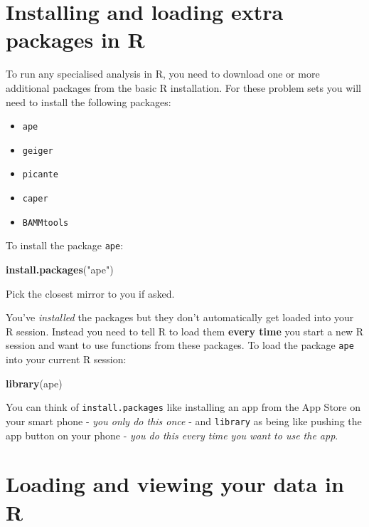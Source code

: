 \documentclass[]{book}
\newenvironment{Shaded}{\begin{snugshade}}{\end{snugshade}}
\newcommand{\KeywordTok}[1]{\textcolor[rgb]{0.13,0.29,0.53}{\textbf{{#1}}}}
\newcommand{\StringTok}[1]{\textcolor[rgb]{0.31,0.60,0.02}{{#1}}}
\newcommand{\NormalTok}[1]{{#1}}
\providecommand{\tightlist}{%
  \setlength{\itemsep}{0pt}\setlength{\parskip}{0pt}}
\theoremstyle{definition}
\theoremstyle{definition}
\theoremstyle{definition}
\theoremstyle{remark}
\begin{document}
\section{Installing and loading extra packages in
R}\label{installing-and-loading-extra-packages-in-r}

To run any specialised analysis in R, you need to download one or more
additional packages from the basic R installation. For these problem
sets you will need to install the following packages:

\begin{itemize}
\tightlist
\item
  \texttt{ape}
\item
  \texttt{geiger}
\item
  \texttt{picante}
\item
  \texttt{caper}
\item
  \texttt{BAMMtools}
\end{itemize}

To install the package \texttt{ape}:

\begin{Shaded}
\begin{Highlighting}[]
\KeywordTok{install.packages}\NormalTok{(}\StringTok{"ape"}\NormalTok{)}
\end{Highlighting}
\end{Shaded}

Pick the closest mirror to you if asked.

You've \emph{installed} the packages but they don't automatically get
loaded into your R session. Instead you need to tell R to load them
\textbf{every time} you start a new R session and want to use functions
from these packages. To load the package \texttt{ape} into your current
R session:

\begin{Shaded}
\begin{Highlighting}[]
\KeywordTok{library}\NormalTok{(ape)}
\end{Highlighting}
\end{Shaded}

You can think of \texttt{install.packages} like installing an app from
the App Store on your smart phone - \emph{you only do this once} - and
\texttt{library} as being like pushing the app button on your phone -
\emph{you do this every time you want to use the app}.

\section{Loading and viewing your data in
R}\label{loading-and-viewing-your-data-in-r}
\end{document}
